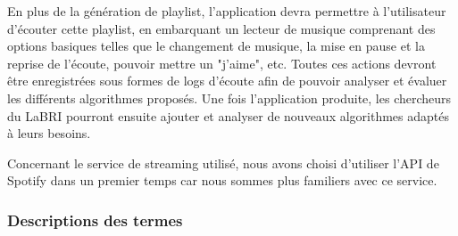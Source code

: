 \documentclass{article}
\begin{document}
    	En plus de la génération de playlist, l'application devra permettre à l'utilisateur d'écouter cette playlist, en embarquant un lecteur de musique comprenant des options basiques telles que le changement de musique, la mise en pause et la reprise de l'écoute, pouvoir mettre un "j'aime", etc. Toutes ces actions devront être enregistrées sous formes de logs d'écoute afin de pouvoir analyser et évaluer les différents algorithmes proposés. Une fois l'application produite, les chercheurs du LaBRI pourront ensuite ajouter et analyser de nouveaux algorithmes adaptés à leurs besoins.
								
		Concernant le service de streaming utilisé, nous avons choisi d'utiliser l'API de Spotify dans un premier temps car nous sommes plus familiers avec ce service.
								
		\subsubsection{Descriptions des termes}
\end{document}
